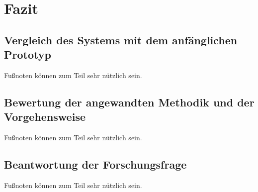 \chapter{Fazit}
\label{cha:fazit}

\section{Vergleich des Systems mit dem anfänglichen Prototyp} 
\label{sec:vergleich_system_prototyp}
Fußnoten können zum Teil sehr nützlich sein. 

\section{Bewertung der angewandten Methodik und der Vorgehensweise} 
\label{sec:bewertung_methodik_vorgehensweise}
Fußnoten können zum Teil sehr nützlich sein. 

\section{Beantwortung der Forschungsfrage} 
\label{sec:beantwortung_forschungsfrage}
Fußnoten können zum Teil sehr nützlich sein. 
